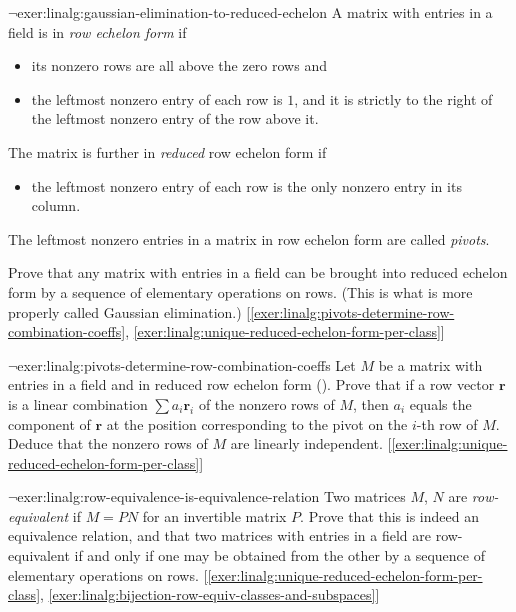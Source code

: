 \begin{exer}{$\lnot$}{exer:linalg:gaussian-elimination-to-reduced-echelon}
  A matrix with entries in a field is in \emph{row echelon form} if
  \begin{itemize}
  \item its nonzero rows are all above the zero rows and
  \item the leftmost nonzero entry of each row is $1$, and it is
    strictly to the right of the leftmost nonzero entry of the row
    above it.
  \end{itemize}
  The matrix is further in \emph{reduced} row echelon form if
  \begin{itemize}
  \item the leftmost nonzero entry of each row is the only nonzero
    entry in its column.
  \end{itemize}
  The leftmost nonzero entries in a matrix in row echelon form are
  called \emph{pivots}.

  Prove that any matrix with entries in a field can be brought into
  reduced echelon form by a sequence of elementary operations on rows.
  (This is what is more properly called Gaussian elimination.)
  [\ref{exer:linalg:pivots-determine-row-combination-coeffs},
  \ref{exer:linalg:unique-reduced-echelon-form-per-class}]
\end{exer}
\begin{exer}{$\lnot$}{exer:linalg:pivots-determine-row-combination-coeffs}
  Let $M$ be a matrix with entries in a field and in reduced row
  echelon form
  (). Prove
  that if a row vector $\mathbf{r}$ is a linear combination
  $\sum a_i \mathbf{r}_i$ of the nonzero rows of $M$, then $a_i$
  equals the component of $\mathbf{r}$ at the position corresponding
  to the pivot on the $i$-th row of $M$. Deduce that the nonzero rows
  of $M$ are linearly
  independent. [\ref{exer:linalg:unique-reduced-echelon-form-per-class}]
\end{exer}
\begin{exer}{$\lnot$}{exer:linalg:row-equivalence-is-equivalence-relation}
  Two matrices $M$, $N$ are \emph{row-equivalent} if $M = PN$ for an
  invertible matrix $P$. Prove that this is indeed an equivalence
  relation, and that two matrices with entries in a field are
  row-equivalent if and only if one may be obtained from the other by
  a sequence of elementary operations on
  rows. [\ref{exer:linalg:unique-reduced-echelon-form-per-class},
  \ref{exer:linalg:bijection-row-equiv-classes-and-subspaces}]
\end{exer}
